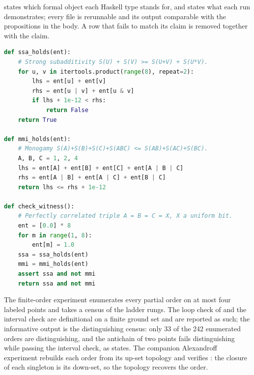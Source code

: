 \documentclass[11pt,letterpaper]{article}
\theoremstyle{definition}
\theoremstyle{remark}
\begin{document}
 states which formal object each Haskell type stands for, and  states what each run demonstrates; every file is rerunnable and its output comparable with the propositions in the body. A row that fails to match its claim is removed together with the claim.

\begin{lstlisting}[language=Python,caption={The inequality checks from \texttt{entropy\_inequalities.py}: the functions that evaluate strong subadditivity and monogamy on an entropy vector.},label=lst:witness]
def ssa_holds(ent):
    # Strong subadditivity S(U) + S(V) >= S(U+V) + S(U*V).
    for u, v in itertools.product(range(8), repeat=2):
        lhs = ent[u] + ent[v]
        rhs = ent[u | v] + ent[u & v]
        if lhs + 1e-12 < rhs:
            return False
    return True

def mmi_holds(ent):
    # Monogamy S(A)+S(B)+S(C)+S(ABC) <= S(AB)+S(AC)+S(BC).
    A, B, C = 1, 2, 4
    lhs = ent[A] + ent[B] + ent[C] + ent[A | B | C]
    rhs = ent[A | B] + ent[A | C] + ent[B | C]
    return lhs <= rhs + 1e-12

def check_witness():
    # Perfectly correlated triple A = B = C = X, X a uniform bit.
    ent = [0.0] * 8
    for m in range(1, 8):
        ent[m] = 1.0
    ssa = ssa_holds(ent)
    mmi = mmi_holds(ent)
    assert ssa and not mmi
    return ssa and not mmi
\end{lstlisting}

The finite-order experiment enumerates every partial order on at most four labeled points and takes a census of the ladder rungs. The loop check of  and the interval check are definitional on a finite ground set and are reported as such; the informative output is the distinguishing census: only 33 of the 242 enumerated orders are distinguishing, and the antichain of two points fails distinguishing while passing the interval check, as  states. The companion Alexandroff experiment rebuilds each order from its up-set topology and verifies : the closure of each singleton is its down-set, so the topology recovers the order.
\end{document}
